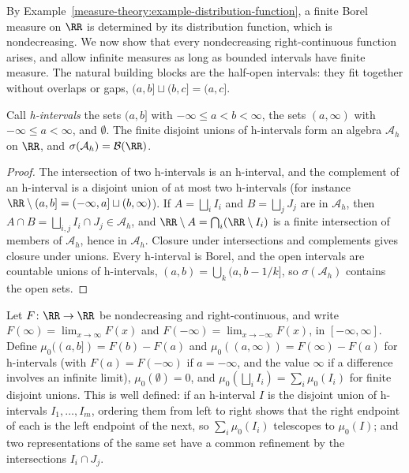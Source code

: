 By Example~\ref{measure-theory:example-distribution-function}, a finite Borel measure on $\RR$ is determined by its distribution function, which is nondecreasing. We now show that every nondecreasing
right-continuous function arises, and allow infinite measures as long as bounded intervals have finite measure. The natural building blocks are the half-open intervals: they fit together without
overlaps or gaps, $(a, b] \sqcup (b, c] = (a, c]$.

\begin{lemma}\label{measure-theory:lemma-half-open-algebra}
Call \emph{h-intervals} the sets $(a, b]$ with $-\infty \leq a < b < \infty$, the sets $(a, \infty)$ with $-\infty \leq a < \infty$, and $\emptyset$. The finite disjoint unions of h-intervals form an
algebra $\mathcal{A}_h$ on $\RR$, and $\sigma(\mathcal{A}_h) = \mathcal{B}(\RR)$.
\end{lemma}

\begin{proof}
The intersection of two h-intervals is an h-interval, and the complement of an h-interval is a disjoint union of at most two h-intervals (for instance $\RR \setminus (a, b] = (-\infty, a] \sqcup (b, \infty)$).
If $A = \bigsqcup_iI_i$ and $B = \bigsqcup_jJ_j$ are in $\mathcal{A}_h$, then $A \cap B = \bigsqcup_{i,j}I_i \cap J_j \in \mathcal{A}_h$, and $\RR \setminus A = \bigcap_i(\RR \setminus I_i)$ is a finite
intersection of members of $\mathcal{A}_h$, hence in $\mathcal{A}_h$. Closure under intersections and complements gives closure under unions. Every h-interval is Borel, and the open intervals are
countable unions of h-intervals, $(a, b) = \bigcup_k(a, b - 1/k]$, so $\sigma(\mathcal{A}_h)$ contains the open sets.
\end{proof}

Let $F \colon \RR \to \RR$ be nondecreasing and right-continuous, and write $F(\infty) = \lim_{x \to \infty}F(x)$ and $F(-\infty) = \lim_{x \to -\infty}F(x)$, in $[-\infty, \infty]$. Define
$\mu_0((a, b]) = F(b) - F(a)$ and $\mu_0((a, \infty)) = F(\infty) - F(a)$ for h-intervals (with $F(a) = F(-\infty)$ if $a = -\infty$, and the value $\infty$ if a difference involves an infinite
limit), $\mu_0(\emptyset) = 0$, and $\mu_0(\bigsqcup_iI_i) = \sum_i\mu_0(I_i)$ for finite disjoint unions. This is well defined: if an h-interval $I$ is the disjoint union of h-intervals
$I_1, \ldots, I_m$, ordering them from left to right shows that the right endpoint of each is the left endpoint of the next, so $\sum_i\mu_0(I_i)$ telescopes to $\mu_0(I)$; and two
representations of the same set have a common refinement by the intersections $I_i \cap J_j$.

